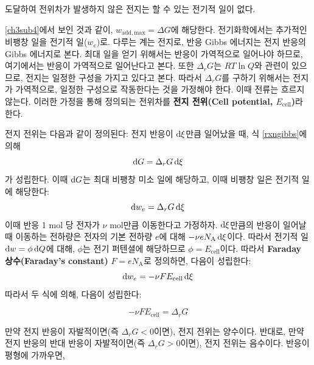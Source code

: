         도달하여 전위차가 발생하지 않은 전지는 할 수 있는 전기적 일이 없다.
        \par \ref{ch3sub4}에서 보인 것과 같이, $w_\mathrm{add,max} = \Delta G$에 해당한다. 전기화학에서는 추가적인 비팽창 일을 전기적 일($w_e$)로. 다루는 계는 전지로, 반응 Gibbs 에너지는 전지 반응의 Gibbs 에너지로 본다. 최대 일을 얻기 위해서는 반응이 가역적으로 일어나야 하므로, 여기에서는 
        반응이 가역적으로 일어난다고 본다. 또한 $\Delta_r G$는 $RT \ln Q$와 관련이 있으므로, 전지는 일정한 구성을 가지고 있다고 본다. 따라서 $\Delta_r G$를 구하기 위해서는 전지가 가역적으로, 일정한 구성으로 작동한다는 것을 가정해야 한다. 
        이때 전류는 흐르지 않는다. 이러한 가정을 통해 정의되는 전위차를 \textbf{전지 전위(Cell potential, $E_\mathrm{cell}$)}라 
        한다.
        \par 전지 전위는 다음과 같이 정의된다: 전지 반응이 $\operatorname{d\!} \xi$만큼 일어났을 때, 식 \ref{rxngibbs}에 의해 
        \begin{equation*}
            \operatorname{d\!} G = \Delta_r G \operatorname{d\!} \xi
        \end{equation*}
        가 성립한다. 이때 $\operatorname{d\!} G$는 최대 비팽창 미소 일에 해당하고, 이때 비팽창 일은 전기적 
        일에 해당한다:
        \begin{equation*}
            \operatorname{d\!} w_e = \Delta_r G \operatorname{d\!} \xi
        \end{equation*}
        이때 반응 1 mol 당 전자가 $\nu$ mol만큼 이동한다고 가정하자. $\operatorname{d\!} \xi$만큼의 반응이 일어날 때 이동하는 전하량은 전자의 기본 전하량 $e$에 대해 $-\nu e N_\mathrm{A} \operatorname{d\!} \xi$이다. 
        따라서 전기적 일 $\operatorname{d\!} w = \phi \operatorname{d\!} Q$에 대해, $\phi$는 전기 퍼텐셜에 해당하므로 $\phi = E_\mathrm{cell}$이다. 
        따라서 \textbf{Faraday 상수(Faraday's constant)} $F = e N_\mathrm{A}$로 정의하면, 
        다음이 성립한다:
        \begin{equation*}
            \operatorname{d\!} w_e = -\nu F E_\mathrm{cell} \operatorname{d\!} \xi
        \end{equation*}
        따라서 두 식에 의해, 다음이 성립한다:
        \begin{law}
        \begin{equation*}
            -\nu F E_\mathrm{cell} = \Delta_r G
        \end{equation*}
        \end{law}
        만약 전지 반응이 자발적이면(즉 $\Delta_r G < 0$이면), 전지 전위는 양수이다. 반대로, 만약 전지 반응의 반대 반응이 자발적이면(즉 $\Delta_r G > 0$이면), 전지 전위는 음수이다. 반응이 평형에 가까우면, 
